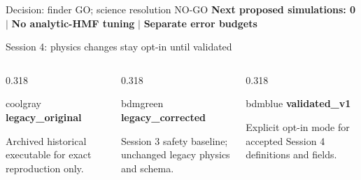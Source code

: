 \documentclass[UTF8]{beamer}
\begin{document}
\begin{frame}{Decision: finder GO; science resolution NO-GO}
  \vfill
  \centering
  \textbf{Next proposed simulations: 0} \quad $\vert$ \quad
  \textbf{No analytic-HMF tuning} \quad $\vert$ \quad
  \textbf{Separate error budgets}
\end{frame}

\begin{frame}{Session 4: physics changes stay opt-in until validated}
  \footnotesize
  \begin{columns}[T,totalwidth=\textwidth]
    \begin{column}{0.318\textwidth}
      \begin{phasebox}[colback=coolgray!6]{coolgray}
        {\color{coolgray}\bfseries legacy\_original}\par\smallskip
        Archived historical executable for exact reproduction only.
      \end{phasebox}
    \end{column}
    \hfill
    \begin{column}{0.318\textwidth}
      \begin{phasebox}[colback=bdmgreen!6]{bdmgreen}
        {\color{bdmgreen}\bfseries legacy\_corrected}\par\smallskip
        Session 3 safety baseline; unchanged legacy physics and schema.
      \end{phasebox}
    \end{column}
    \hfill
    \begin{column}{0.318\textwidth}
      \begin{phasebox}[colback=bdmblue!6]{bdmblue}
        {\color{bdmblue}\bfseries validated\_v1}\par\smallskip
        Explicit opt-in mode for accepted Session 4 definitions and fields.
      \end{phasebox}
    \end{column}
  \end{columns}

  \vspace{0.5ex}


\end{frame}
\end{document}
